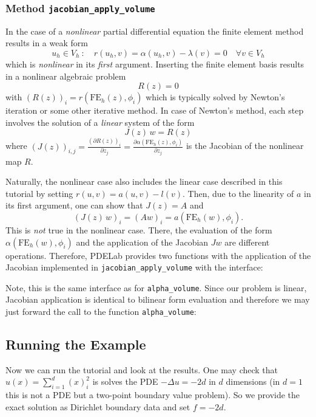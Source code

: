 \documentclass[a4paper,12pt]{article}
\begin{document}
\subsubsection*{Method \lstinline{jacobian_apply_volume}}

In the case of a {\em nonlinear} partial differential equation
the finite element method results in a weak form 
$$u_h \in V_h \ : \quad r(u_h,v) = \alpha(u_h,v) - \lambda(v) = 0 \quad \forall v\in V_h$$
which is {\em nonlinear} in its {\em first} argument. Inserting
the finite element basis results in a nonlinear algebraic problem
$$R(z) = 0$$
with $(R(z))_i = r(\text{FE}_h(z),\phi_i)$ which is typically solved by Newton's iteration
or some other iterative method. In case of Newton's method, each step
involves the solution of a {\em linear} system of the form
$$J(z)\, w = R(z)$$
where $(J(z))_{i,j} = \frac{(\partial R(z))_i}{\partial z_j} = 
\frac{\partial \alpha(\text{FE}_h(z),\phi_i)}{\partial z_j}$ is the Jacobian of 
the nonlinear map $R$.

Naturally, the nonlinear case also includes the linear case described in this tutorial
by setting $r(u,v) = a(u,v)-l(v)$. Then, due to the linearity of $a$ in its first
argument, one can show that $J(z) = A$ and 
$$(J(z)\, w)_i = (Aw)_i = a(\text{FE}_h(w),\phi_i).$$
This is {\em not} true in the nonlinear case. There, the evaluation 
of the form $\alpha(\text{FE}_h(w),\phi_i)$ and the application of the Jacobian $J w$
are different operations. Therefore, PDELab provides two functions with
the application of the Jacobian implemented in \lstinline{jacobian_apply_volume}
with the interface:

Note, this is the same interface as for \lstinline{alpha_volume}.
Since our problem is linear, Jacobian application is identical to bilinear form
evaluation and therefore we may just forward the call to the
function \lstinline{alpha_volume}:


\subsection{Running the Example}

Now we can run the tutorial and look at the results.
One may check that $u(x) = \sum_{i=1}^d (x)_i^2$ is
solves the PDE $-\Delta u = -2d$ in $d$ dimensions
(in $d=1$ this is not a PDE but a two-point boundary value problem).
So we provide the exact solution as Dirichlet boundary data and set $f=-2d$. 
\end{document}

